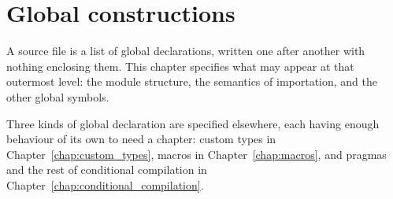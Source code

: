 \chapter{Global constructions}%
\label{chap:global}

A source file is a list of global declarations, written one after another with
nothing enclosing them. This chapter specifies what may appear at that outermost
level: the module structure, the semantics of importation, and the other global
symbols.

Three kinds of global declaration are specified elsewhere, each having enough
behaviour of its own to need a chapter: custom types in
Chapter~\ref{chap:custom_types}, macros in Chapter~\ref{chap:macros}, and pragmas
and the rest of conditional compilation in
Chapter~\ref{chap:conditional_compilation}.

\minitoc%







